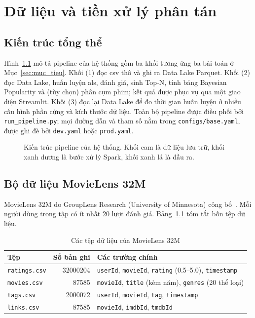 \chapter{Dữ liệu và tiền xử lý phân tán}
\label{chap:du_lieu}

\section{Kiến trúc tổng thể}
\label{sec:kien_truc}
Hình~\ref{fig:kien_truc} mô tả pipeline của hệ thống gồm ba khối tương ứng ba bài toán ở Mục~\ref{sec:muc_tieu}. Khối (1) đọc \gls{csv} thô và ghi ra Data Lake Parquet. Khối (2) đọc Data Lake, huấn luyện \gls{als}, đánh giá, sinh Top-N, tính bảng Bayesian Popularity và (tùy chọn) phân cụm phim; kết quả được phục vụ qua một giao diện Streamlit. Khối (3) đọc lại Data Lake để đo thời gian huấn luyện ở nhiều cấu hình phần cứng và kích thước dữ liệu. Toàn bộ pipeline được điều phối bởi \texttt{run\_pipeline.py}; mọi đường dẫn và tham số nằm trong \texttt{configs/base.yaml}, được ghi đè bởi \texttt{dev.yaml} hoặc \texttt{prod.yaml}.

\begin{figure}[H]
\centering
\resizebox{\textwidth}{!}{}
\vspace{5mm}
\caption[Kiến trúc pipeline của hệ thống]{Kiến trúc pipeline của hệ thống. Khối cam là dữ liệu lưu trữ, khối xanh dương là bước xử lý Spark, khối xanh lá là đầu ra.}
\label{fig:kien_truc}
\end{figure}

\section{Bộ dữ liệu MovieLens 32M}
\label{sec:dataset}
MovieLens 32M do GroupLens Research (University of Minnesota) công bố~\cite{grouplens32m}. Mỗi người dùng trong tập có ít nhất \num{20} lượt đánh giá. Bảng~\ref{tab:dataset} tóm tắt bốn tệp dữ liệu.

\begin{table}[H]
\centering
\caption{Các tệp dữ liệu của MovieLens 32M}
\label{tab:dataset}
\begin{tabular}{l r l}
\toprule
\textbf{Tệp} & \textbf{Số bản ghi} & \textbf{Các trường chính} \\
\midrule
\texttt{ratings.csv} & \num{32000204} & \texttt{userId}, \texttt{movieId}, \texttt{rating} (\num{0,5}--\num{5,0}), \texttt{timestamp} \\
\texttt{movies.csv}  & \num{87585}    & \texttt{movieId}, \texttt{title} (kèm năm), \texttt{genres} (20 thể loại) \\
\texttt{tags.csv}    & \num{2000072}  & \texttt{userId}, \texttt{movieId}, \texttt{tag}, \texttt{timestamp} \\
\texttt{links.csv}   & \num{87585}    & \texttt{movieId}, \texttt{imdbId}, \texttt{tmdbId} \\
\bottomrule
\end{tabular}
\end{table}

